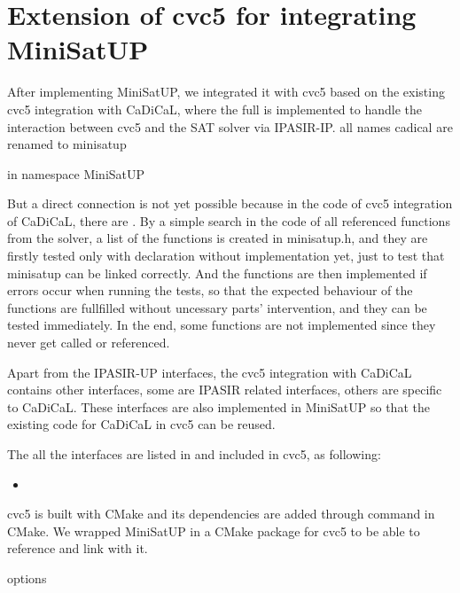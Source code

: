\section{Extension of cvc5 for integrating MiniSatUP}

After implementing MiniSatUP, we integrated it with cvc5 based on the existing cvc5 integration with CaDiCaL, where the full  is implemented to handle the interaction between cvc5 and the SAT solver via IPASIR-IP.
all names cadical are renamed to minisatup

in namespace MiniSatUP

But a direct connection is not yet possible because in the code of cvc5 integration of CaDiCaL, there are .
By a simple search in the code of all referenced functions from the solver, a list of the functions is created in minisatup.h, and they are firstly tested only with declaration without implementation yet, just to test that minisatup can be linked correctly. And the functions are then implemented if errors occur when running the tests, so that the expected behaviour of the functions are fullfilled without uncessary parts' intervention, and they can be tested immediately. In the end, some functions are not implemented since they never get called or referenced.


Apart from the IPASIR-UP interfaces, the cvc5 integration with CaDiCaL contains other interfaces, some are IPASIR related interfaces, others are specific to CaDiCaL. These interfaces are also implemented in MiniSatUP so that the existing code for CaDiCaL in cvc5 can be reused.

The all the interfaces are listed in  and included in cvc5, as following:

\begin{itemize}
  \item 
\end{itemize}


cvc5 is built with CMake and its dependencies are added through  command in CMake. We wrapped MiniSatUP in a CMake package for cvc5 to be able to reference and link with it.

options

